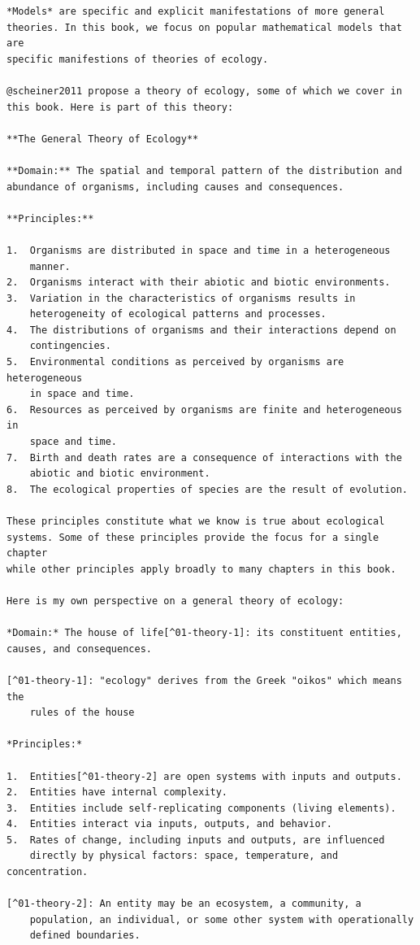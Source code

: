 \documentclass[
  10pt,
  letterpaper,
  nols]{tufte-book}
\begin{document}
\begin{verbatim}
*Models* are specific and explicit manifestations of more general
theories. In this book, we focus on popular mathematical models that are
specific manifestions of theories of ecology.

@scheiner2011 propose a theory of ecology, some of which we cover in
this book. Here is part of this theory:

**The General Theory of Ecology**

**Domain:** The spatial and temporal pattern of the distribution and
abundance of organisms, including causes and consequences.

**Principles:**

1.  Organisms are distributed in space and time in a heterogeneous
    manner.
2.  Organisms interact with their abiotic and biotic environments.
3.  Variation in the characteristics of organisms results in
    heterogeneity of ecological patterns and processes.
4.  The distributions of organisms and their interactions depend on
    contingencies.
5.  Environmental conditions as perceived by organisms are heterogeneous
    in space and time.
6.  Resources as perceived by organisms are finite and heterogeneous in
    space and time.
7.  Birth and death rates are a consequence of interactions with the
    abiotic and biotic environment.
8.  The ecological properties of species are the result of evolution.

These principles constitute what we know is true about ecological
systems. Some of these principles provide the focus for a single chapter
while other principles apply broadly to many chapters in this book.

Here is my own perspective on a general theory of ecology:

*Domain:* The house of life[^01-theory-1]: its constituent entities,
causes, and consequences.

[^01-theory-1]: "ecology" derives from the Greek "oikos" which means the
    rules of the house

*Principles:*

1.  Entities[^01-theory-2] are open systems with inputs and outputs.
2.  Entities have internal complexity.
3.  Entities include self-replicating components (living elements).
4.  Entities interact via inputs, outputs, and behavior.
5.  Rates of change, including inputs and outputs, are influenced
    directly by physical factors: space, temperature, and concentration.

[^01-theory-2]: An entity may be an ecosystem, a community, a
    population, an individual, or some other system with operationally
    defined boundaries.


\end{verbatim}
\end{document}
